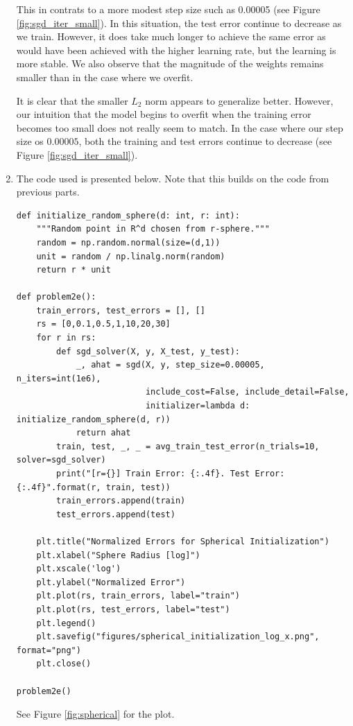 \documentclass[12pt]{article}
\begin{document}
\begin{enumerate}[label=(\alph*)]
    This in contrats to a more modest step size such as 0.00005 (see Figure \ref{fig:sgd_iter_small}). In this situation, the test error continue to decrease as we train. However, it does take much longer to achieve the same error as would have been achieved with the higher learning rate, but the learning is more stable. We also observe that the magnitude of the weights remains smaller than in the case where we overfit. 

    It is clear that the smaller $L_2$ norm appears to generalize better. However, our intuition that the model begins to overfit when the training error becomes too small does not really seem to match. In the case where our step size os $0.00005$, both the training and test errors continue to decrease (see Figure \ref{fig:sgd_iter_small}).

    \item
      The code used is presented below. Note that this builds on the code from previous parts.
      \begin{verbatim}
def initialize_random_sphere(d: int, r: int):
    """Random point in R^d chosen from r-sphere."""
    random = np.random.normal(size=(d,1))
    unit = random / np.linalg.norm(random)
    return r * unit

def problem2e():
    train_errors, test_errors = [], []
    rs = [0,0.1,0.5,1,10,20,30]
    for r in rs:
        def sgd_solver(X, y, X_test, y_test):
            _, ahat = sgd(X, y, step_size=0.00005, n_iters=int(1e6),
                          include_cost=False, include_detail=False,
                          initializer=lambda d: initialize_random_sphere(d, r))
            return ahat
        train, test, _, _ = avg_train_test_error(n_trials=10, solver=sgd_solver)
        print("[r={}] Train Error: {:.4f}. Test Error: {:.4f}".format(r, train, test))
        train_errors.append(train)
        test_errors.append(test)
    
    plt.title("Normalized Errors for Spherical Initialization")
    plt.xlabel("Sphere Radius [log]")
    plt.xscale('log')
    plt.ylabel("Normalized Error")
    plt.plot(rs, train_errors, label="train")
    plt.plot(rs, test_errors, label="test")
    plt.legend()
    plt.savefig("figures/spherical_initialization_log_x.png", format="png")
    plt.close()

problem2e()
      \end{verbatim}

      See Figure \ref{fig:spherical} for the plot.


\end{enumerate}
\end{document}
